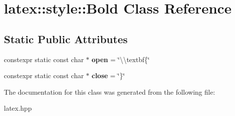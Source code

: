 \hypertarget{classlatex_1_1style_1_1Bold}{\section{latex\-:\-:style\-:\-:Bold Class Reference}
\label{classlatex_1_1style_1_1Bold}
}
\subsection*{Static Public Attributes}
\begin{DoxyCompactItemize}
\item 
\hypertarget{classlatex_1_1style_1_1Bold_a3802de3a45ede8381489dc53c647fb82}{constexpr static const char $\ast$ {\bfseries open} = \char`\"{}\textbackslash{}\textbackslash{}textbf\{\char`\"{}}\label{classlatex_1_1style_1_1Bold_a3802de3a45ede8381489dc53c647fb82}

\item 
\hypertarget{classlatex_1_1style_1_1Bold_ad81c547be1c60043179f03e24802a64c}{constexpr static const char $\ast$ {\bfseries close} = \char`\"{}\}\char`\"{}}\label{classlatex_1_1style_1_1Bold_ad81c547be1c60043179f03e24802a64c}

\end{DoxyCompactItemize}


The documentation for this class was generated from the following file\-:\begin{DoxyCompactItemize}
\item 
latex.\-hpp\end{DoxyCompactItemize}
